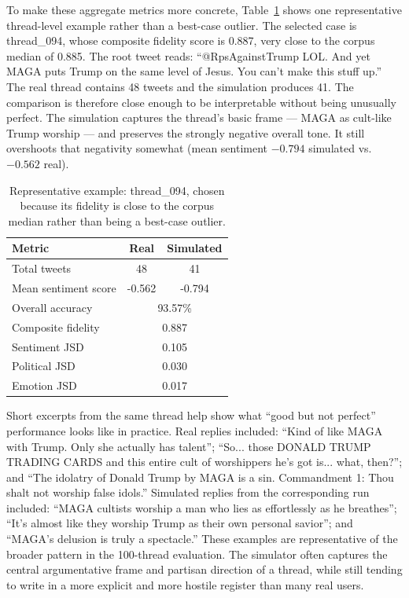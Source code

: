 \documentclass[logo,bsc,singlespacing,parskip,online]{infthesis}
\begin{document}
To make these aggregate metrics more concrete, Table~\ref{tab:representative_thread} shows one representative thread-level example rather than a best-case outlier. The selected case is thread\_094, whose composite fidelity score is 0.887, very close to the corpus median of 0.885. The root tweet reads: ``@RpsAgainstTrump LOL. And yet MAGA puts Trump on the same level of Jesus. You can't make this stuff up.'' The real thread contains 48 tweets and the simulation produces 41. The comparison is therefore close enough to be interpretable without being unusually perfect. The simulation captures the thread's basic frame --- MAGA as cult-like Trump worship --- and preserves the strongly negative overall tone. It still overshoots that negativity somewhat (mean sentiment $-0.794$ simulated vs.\ $-0.562$ real).

\begin{table}[ht]
\centering
\caption{Representative example: thread\_094, chosen because its fidelity is close to the corpus median rather than being a best-case outlier.}
\label{tab:representative_thread}
\begin{tabular}{lcc}
\toprule
\textbf{Metric} & \textbf{Real} & \textbf{Simulated} \\
\midrule
Total tweets & 48 & 41 \\
Mean sentiment score & -0.562 & -0.794 \\
Overall accuracy & \multicolumn{2}{c}{93.57\%} \\
Composite fidelity & \multicolumn{2}{c}{0.887} \\
Sentiment JSD & \multicolumn{2}{c}{0.105} \\
Political JSD & \multicolumn{2}{c}{0.030} \\
Emotion JSD & \multicolumn{2}{c}{0.017} \\
\bottomrule
\end{tabular}
\end{table}

Short excerpts from the same thread help show what ``good but not perfect'' performance looks like in practice. Real replies included: ``Kind of like MAGA with Trump. Only she actually has talent''; ``So... those DONALD TRUMP TRADING CARDS and this entire cult of worshippers he's got is... what, then?''; and ``The idolatry of Donald Trump by MAGA is a sin. Commandment 1: Thou shalt not worship false idols.'' Simulated replies from the corresponding run included: ``MAGA cultists worship a man who lies as effortlessly as he breathes''; ``It's almost like they worship Trump as their own personal savior''; and ``MAGA's delusion is truly a spectacle.'' These examples are representative of the broader pattern in the 100-thread evaluation. The simulator often captures the central argumentative frame and partisan direction of a thread, while still tending to write in a more explicit and more hostile register than many real users.
\end{document}
